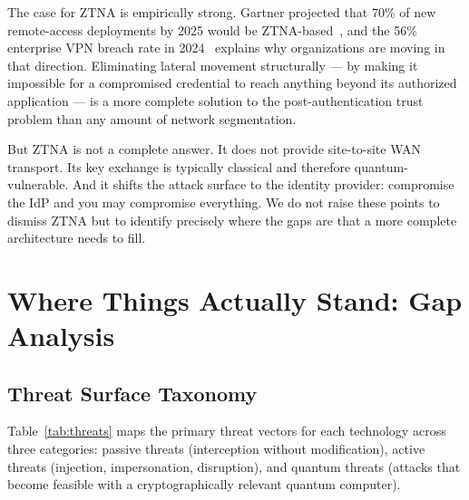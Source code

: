 \documentclass[conference]{IEEEtran}
\begin{document}
The case for ZTNA is empirically strong. Gartner projected
that 70\% of new remote-access deployments by 2025 would be
ZTNA-based~\cite{gartner2023}, and the 56\% enterprise VPN
breach rate in 2024~\cite{cybersec2024} explains why organizations
are moving in that direction. Eliminating lateral movement
structurally --- by making it impossible for a compromised
credential to reach anything beyond its authorized application
--- is a more complete solution to the post-authentication
trust problem than any amount of network segmentation.

But ZTNA is not a complete answer. It does not provide
site-to-site WAN transport. Its key exchange is typically
classical and therefore quantum-vulnerable. And it shifts the
attack surface to the identity provider: compromise the IdP
and you may compromise everything. We do not raise these points
to dismiss ZTNA but to identify precisely where the gaps are
that a more complete architecture needs to fill.

\section{Where Things Actually Stand: Gap Analysis}
\label{sec:threatscape}

\subsection{Threat Surface Taxonomy}

Table~\ref{tab:threats} maps the primary threat vectors for
each technology across three categories: passive threats
(interception without modification), active threats (injection,
impersonation, disruption), and quantum threats (attacks that
become feasible with a cryptographically relevant quantum
computer).
\end{document}

